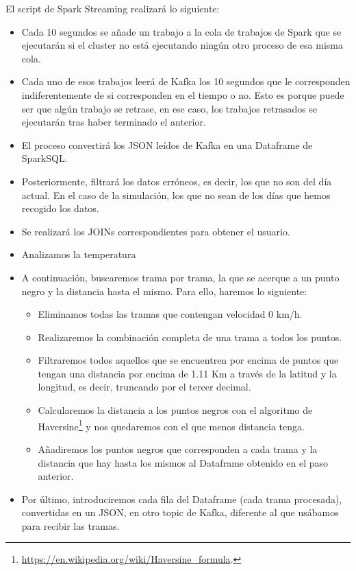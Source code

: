 El script de Spark Streaming realizará lo siguiente:

\begin{itemize}
\item Cada 10 segundos se añade un trabajo a la cola de trabajos de Spark
  que se ejecutarán si el cluster no está ejecutando ningún otro proceso de
  esa misma cola.
\item Cada uno de esos trabajos leerá de Kafka los 10 segundos que le
  corresponden indiferentemente de si corresponden en el tiempo o no. Esto
  es porque puede ser que algún trabajo se retrase, en ese caso, los
  trabajos retrasados se ejecutarán tras haber terminado el anterior.
\item El proceso convertirá los JSON leídos de Kafka en una Dataframe de
  SparkSQL.
\item Posteriormente, filtrará los datos erróneos, es decir, los que no son
  del día actual. En el caso de la simulación, los que no sean de los días
  que hemos recogido los datos.
\item Se realizará los JOINs correspondientes para obtener el usuario.
\item Analizamos la temperatura
\item A continuación, buscaremos trama por trama, la que se acerque a un
  punto negro y la distancia hasta el mismo. Para ello, haremos lo
  siguiente:
  \begin{itemize}
  \item Eliminamos todas las tramas que contengan velocidad 0 km/h.
  \item Realizaremos la combinación completa de una trama a todos los
    puntos.
  \item Filtraremos todos aquellos que se encuentren por encima de puntos
    que tengan una distancia por encima de 1.11 Km a través de la latitud y
    la longitud, es decir, truncando por el tercer decimal.
  \item Calcularemos la distancia a los puntos negros con el algoritmo de
    Haversine\footnote{\url{https://en.wikipedia.org/wiki/Haversine_formula}.}
    y nos quedaremos con el que menos distancia tenga.
  \item Añadiremos los puntos negros que corresponden a cada trama y la
    distancia que hay hasta los mismos al Dataframe obtenido en el paso
    anterior.
  \end{itemize}
\item Por último, introduciremos cada fila del Dataframe (cada trama
  procesada), convertidas en un JSON, en otro topic de Kafka, diferente al
  que usábamos para recibir las tramas.
\end{itemize}


